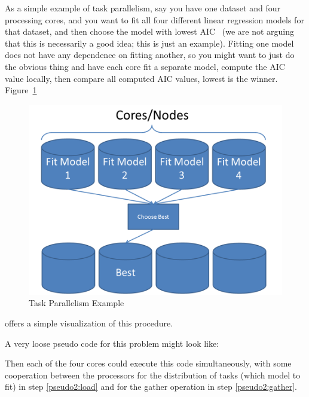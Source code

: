 As a simple example of task parallelism, say you have one dataset and four
processing cores, and you want to fit all four different linear regression
models for that dataset, and then choose the model with lowest
AIC~\citep{aic} (we are not arguing that this is necessarily a good idea; this
is just an example). Fitting one model does not have any dependence on
fitting another, so you might want to just do the obvious thing and have each
core fit a separate model, compute the AIC value locally, then compare all
computed AIC values, lowest is the winner. Figure~\ref{fig:taskparallel} 
\begin{figure}[h]
 \centering
 \includegraphics[scale=.45]{pbdDEMO-include/pics/parallelism_task}
 \caption{Task Parallelism Example}
 \label{fig:taskparallel}
\end{figure}
offers a simple visualization of this procedure.


A very loose pseudo code for this problem might look like:


Then each of the four cores could execute this code simultaneously, with some
cooperation between the processors for the distribution of tasks (which model
to fit) in step \ref{pseudo2:load} and for the gather operation in
step \ref{pseudo2:gather}.


